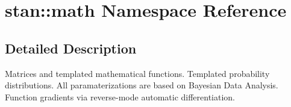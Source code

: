 \hypertarget{namespacestan_1_1math}{}\section{stan\+:\+:math Namespace Reference}
\label{namespacestan_1_1math}


\subsection{Detailed Description}
Matrices and templated mathematical functions. Templated probability distributions. All paramaterizations are based on Bayesian Data Analysis. Function gradients via reverse-\/mode automatic differentiation. 